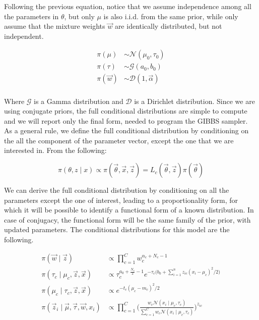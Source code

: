\documentclass{article}
\begin{document}
Following the previous equation, notice that we assume independence among all the parameters in $\theta$, but only $\mu$ is also i.i.d. from the same prior, while only assume that the mixture weights $\vec w$ are identically distributed, but not independent. 

\begin{align*} 
\pi(\mu) & \sim \mathcal{N}(\mu_0, \tau_0) \\
\pi(\tau) &\sim \mathcal{G}(a_0,b_0) \\
\pi(\vec w) & \sim \mathcal{D}(1, \vec \alpha)\\
\end{align*}

Where $\mathcal{G}$ is a Gamma distribution and $\mathcal{D}$ is a Dirichlet distribution. Since we are using conjugate priors, the full conditional distributions are simple to compute and we will report only the final form, needed to program the GIBBS sampler. As a general rule, we define the full conditional distribution by conditioning on the all the component of the parameter vector, except the one that we are interested in. From the following:

\begin{equation}
\pi(\theta, z \mid  x) \propto \pi(\vec \theta, \vec x, \vec z) = L_c(\vec \theta, \vec z) \pi(\vec \theta)
\end{equation}

We can derive the full conditional distribution by conditioning on all the parameters except the one of interest, leading to a proportionality form, for which it will be possible to identify a functional form of a known distribution. In case of conjugacy, the functional form will be the same family of the prior, with updated parameters. The conditional distributions for this model are the following.

\begin{align*}
\pi(\vec w \mid \vec z) & \propto \prod_{c=1}^C w_c^{\alpha_c + N_c -1}  \\
\pi(\tau_c \mid \mu_c, \vec z, \vec x) & \propto \tau_c^{a_0 + \frac{N_c}{2} - 1} e^{-\tau_c \big( b_0 + \sum_{i=1}^n z_{ic} (x_i - \mu_c)^2/2 \big )} \\
\pi(\mu_c \mid \tau_c, \vec z, \vec x )  & \propto e^{-t_c (\mu_c - m_c)^2/2}\\
\pi(\vec z_i \mid \vec \mu, \vec \tau, \vec w, x_i) & \propto \prod_{c=1}^C \bigg (\frac{w_c \mathcal{N}(x_i \mid \mu_c, \tau_c)}{\sum_{c=1}^C w_c \mathcal{N}(x_i \mid \mu_c, \tau_c)}\bigg)^{z_{ic}}
\end{align*}
\end{document}
